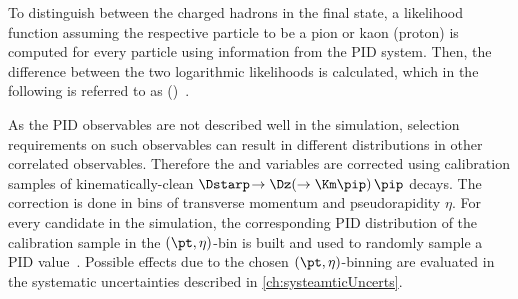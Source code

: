 To distinguish between the charged hadrons in the final state, a likelihood function assuming the respective particle to be a pion or kaon (proton) is computed for every particle using information from the PID system.
Then, the difference between the two logarithmic likelihoods is calculated, which in the following is referred to as \dllkpi (\dllppi)~\cite{Aaij:2014jba}.

As the PID observables are not described well in the simulation, selection requirements on such observables can result in different distributions in other correlated observables.
Therefore the \dllkpi and \dllppi variables are corrected using calibration samples of kinematically-clean $\Dstarp\!\to\Dz\!\left(\to\Km\pip\right)\pip$ decays.
The correction is done in bins of transverse momentum \pt and pseudorapidity $\eta$.
For every candidate in the simulation, the corresponding PID distribution of the calibration sample in the $(\pt,\eta)$-bin is built and used to randomly sample a PID value~\cite{Anderlini:2202412}.
Possible effects due to the chosen $(\pt,\eta)$-binning are evaluated in the systematic uncertainties described in \cref{ch:systeamticUncerts}.

